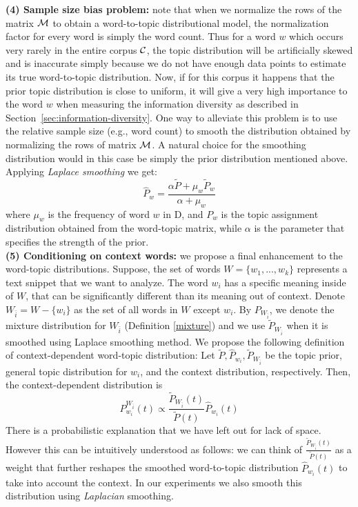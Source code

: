 \documentclass{article}
\begin{document}
{\bf (4) Sample size bias problem:}  note that 
when we normalize the rows of the matrix ${\mathcal M}$ to obtain a word-to-topic distributional model, the normalization factor 
for every word is simply the word count. Thus for a word $w$ which occurs very rarely
in the entire corpus ${\mathcal C}$, the topic distribution will be artificially skewed and is inaccurate simply because we do not have enough data points to estimate its true word-to-topic distribution.
Now, if for this corpus it happens that the prior topic distribution
is close to uniform, it will give a very high importance to the word
$w$ when measuring the information diversity as described in
Section~\ref{sec:information-diversity}.
One way to alleviate this
problem is to use the relative sample size (e.g., word count) to
smooth the distribution obtained by normalizing the rows of matrix
${\mathcal M}$. A natural choice for the smoothing distribution would in this
case be simply the prior distribution mentioned above. Applying {\em Laplace smoothing}
we get:
\begin{equation}
\widehat{P}_w=\frac{\alpha \tilde{P}+ \mu_w \tilde{P}_w}{\alpha+\mu_w}
\end{equation}
where $\mu_w$ is the frequency of word $w$ in D, and $P_w$ is the
topic assignment distribution obtained from the word-topic matrix,
while $\alpha$ is the parameter that specifies the strength of the
prior.\\
{\bf (5) Conditioning on context words:} we propose a final enhancement to the word-topic
distributions. Suppose, the set of words $W=\{w_1,...,w_k\}$
represents a text snippet that we want to analyze. The word $w_i$ has
a specific meaning inside of $W$, that can be significantly different
than its meaning out of context. Denote
$W_{\bar{i}}=W-\{w_i\}$ as the set of all words in $W$ except
$w_i$. By $P_{W_{\bar{i}}}$, we denote the mixture distribution for $W_{\bar{i}}$ (Definition \ref{mixture}) and we use $\tilde{P}_{W_{\bar{i}}}$ when it is smoothed using Laplace smoothing method. We
propose the following definition of context-dependent word-topic
distribution:
\bed
Let $\tilde{P},\widehat{P}_{w_i}, \tilde{P}_{W_{\bar{i}}}$ be the topic prior, general
topic distribution for $w_i$, and the context distribution,
respectively. Then, the context-dependent distribution is
\begin{equation*}
P^{W_{\bar{i}}}_{w_i}(t)\propto \frac{\tilde{P}_{W_{\bar{i}}}(t)}{\tilde{P}(t)}\widehat{P}_{w_i}(t)
\end{equation*}
\eed
There is a probabilistic explanation that we have left out for 
lack of space. However this can be intuitively understood as follows:
we can think of $\frac{\tilde{P}_{W_{\bar{i}}}(t)}{\tilde{P}(t)}$ as a weight
that further reshapes the smoothed word-to-topic distribution $\widehat{P}_{w_i}(t)$
to take into account the context. In our experiments we also smooth this distribution
using {\em Laplacian} smoothing.
\end{document}
